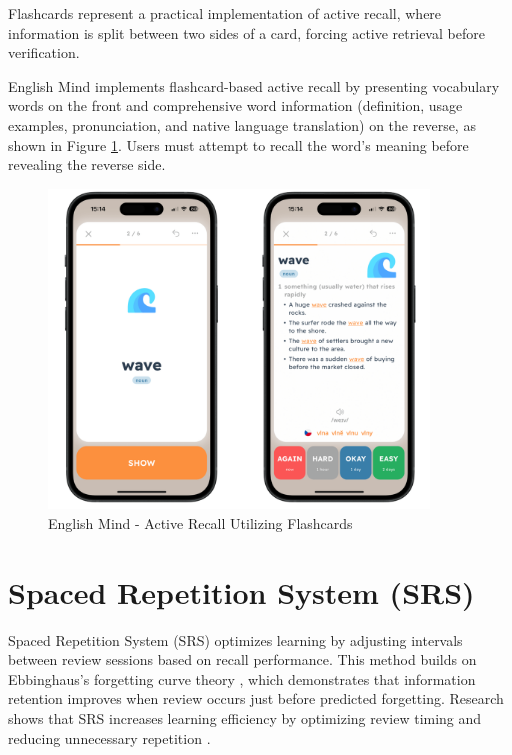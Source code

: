 Flashcards represent a practical implementation of active recall, where information is split between two sides of a card, forcing active retrieval before verification.

English Mind implements flashcard-based active recall by presenting vocabulary words on the front and comprehensive word information (definition, usage examples, pronunciation, and native language translation) on the reverse, as shown in Figure \ref{fig:em-flashcards}. Users must attempt to recall the word's meaning before revealing the reverse side.

\begin{figure}[!h]
    \includegraphics[width=0.9\textwidth]{src/figures/em-flashcards.png}
    \caption{English Mind - Active Recall Utilizing Flashcards}
    \label{fig:em-flashcards}
\end{figure}

\section{Spaced Repetition System (SRS)}

Spaced Repetition System (SRS) optimizes learning by adjusting intervals between review sessions based on recall performance. This method builds on Ebbinghaus's forgetting curve theory \cite{cite:ebbinghaus2013_memory_contribution_to_experimantal_psychology}, which demonstrates that information retention improves when review occurs just before predicted forgetting. Research shows that SRS increases learning efficiency by optimizing review timing and reducing unnecessary repetition \cite{cite:kang2016_spaced_repetiton_promotes_efficient_learning}.

